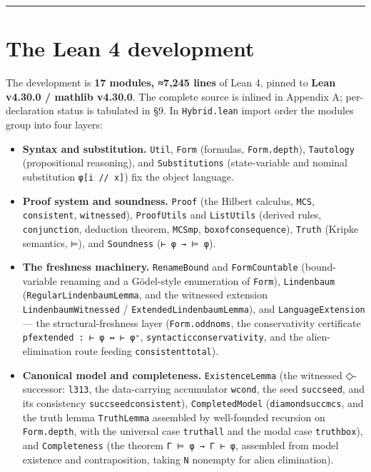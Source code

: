 \documentclass[11pt,a4paper]{article}
\renewcommand{\_}{\origtextunderscore\allowbreak}
\begin{document}
\begin{center}\rule{0.5\linewidth}{0.5pt}\end{center}

\hypertarget{the-lean-4-development}{%
\section{The Lean 4 development}\label{the-lean-4-development}}

The development is \textbf{17 modules, ≈7,245 lines} of Lean 4, pinned to \textbf{Lean v4.30.0 / mathlib v4.30.0}. The complete source is inlined in Appendix A; per-declaration status is tabulated in §9. In \texttt{Hybrid.lean} import order the modules group into four layers:

\begin{itemize}
\item
  \textbf{Syntax and substitution.} \texttt{Util}, \texttt{Form} (formulas, \texttt{Form.depth}), \texttt{Tautology} (propositional reasoning), and \texttt{Substitutions} (state-variable and nominal substitution \texttt{φ{[}i\ //\ x{]}}) fix the object language.
\item
  \textbf{Proof system and soundness.} \texttt{Proof} (the Hilbert calculus, \texttt{MCS}, \texttt{consistent}, \texttt{witnessed}), \texttt{ProofUtils} and \texttt{ListUtils} (derived rules, \texttt{conjunction}, deduction theorem, \texttt{MCS\_mp}, \texttt{box\_of\_consequence}), \texttt{Truth} (Kripke semantics, \texttt{⊨}), and \texttt{Soundness} (\texttt{⊢\ φ\ →\ ⊨\ φ}).
\item
  \textbf{The freshness machinery.} \texttt{RenameBound} and \texttt{FormCountable} (bound-variable renaming and a Gödel-style enumeration of \texttt{Form}), \texttt{Lindenbaum} (\texttt{RegularLindenbaumLemma}, and the witnessed extension \texttt{LindenbaumWitnessed} / \texttt{ExtendedLindenbaumLemma}), and \texttt{LanguageExtension} --- the structural-freshness layer (\texttt{Form.odd\_noms}, the conservativity certificate \texttt{pf\_extended\ :\ ⊢\ φ\ ↔\ ⊢\ φ⁺}, \texttt{syntactic\_conservativity}, and the alien-elimination route feeding \texttt{consistent\_total}).
\item
  \textbf{Canonical model and completeness.} \texttt{ExistenceLemma} (the witnessed ◇-successor: \texttt{l313\textquotesingle{}}, the data-carrying accumulator \texttt{wcond}, the seed \texttt{succ\_seed}, and its consistency \texttt{succ\_seed\_consistent}), \texttt{CompletedModel} (\texttt{diamond\_succ\_mcs}, and the truth lemma \texttt{TruthLemma} assembled by well-founded recursion on \texttt{Form.depth}, with the universal case \texttt{truth\_all} and the modal case \texttt{truth\_box}), and \texttt{Completeness} (the theorem \texttt{Γ\ ⊨\ φ\ →\ Γ\ ⊢\ φ}, assembled from model existence and contraposition, taking \texttt{N} nonempty for alien elimination).
\end{itemize}
\end{document}
